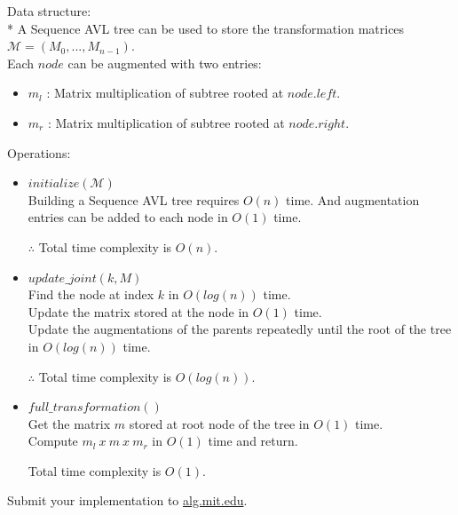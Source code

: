 \documentclass[12pt,twoside]{article}
\begin{document}
\begin{problems}
Data structure: \\
* A Sequence AVL tree can be used to store the transformation matrices $\mathcal{M} = (M_0, ..., M_{n-1})$. \\
Each $node$ can be augmented with two entries:
\begin{itemize}
    \item $m_l$ : Matrix multiplication of subtree rooted at $node.left$.
    \item $m_r$ : Matrix multiplication of subtree rooted at $node.right$.
\end{itemize}


Operations:
\begin{itemize}
    \item $initialize(\mathcal{M})$ \\
    Building a Sequence AVL tree requires $O(n)$ time. And augmentation entries can be added to each node in $O(1)$ time. 
    
    $\therefore$ Total time complexity is $O(n)$.
    
    \item $update\_joint(k, M)$ \\
    Find the node at index $k$ in $O(log(n))$ time. \\
    Update the matrix stored at the node in $O(1)$ time. \\
    Update the augmentations of the parents repeatedly until the root of the tree in $O(log(n))$ time.
    
    $\therefore$ Total time complexity is $O(log(n))$.
    
    \item $full\_transformation()$ \\
    Get the matrix $m$ stored at root node of the tree in $O(1)$ time. \\
    Compute $m_l\ x\ m\ x\ m_r$ in $O(1)$ time and return.
    
    Total time complexity is $O(1)$.
\end{itemize}

\newpage
\problem  %
\begin{problemparts}
\problempart %
\problempart %
\problempart %
\problempart Submit your implementation to {\small\url{alg.mit.edu}}.
\end{problemparts}

\end{problems}
\end{document}
